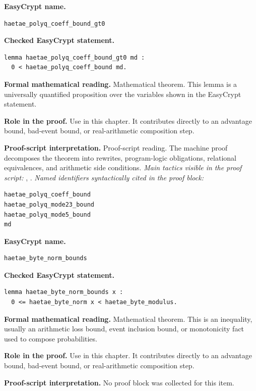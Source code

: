 \begin{formaltheorem}
\noindent\textbf{EasyCrypt name.}
\begin{lstlisting}[language=EasyCrypt,basicstyle=\ttfamily\scriptsize]
haetae_polyq_coeff_bound_gt0
\end{lstlisting}
\noindent\textbf{Checked EasyCrypt statement.}
\begin{lstlisting}[language=EasyCrypt,basicstyle=\ttfamily\scriptsize]
lemma haetae_polyq_coeff_bound_gt0 md :
  0 < haetae_polyq_coeff_bound md.
\end{lstlisting}
\noindent\textbf{Formal mathematical reading.}
Mathematical theorem. This lemma is a universally quantified proposition over the variables shown in the EasyCrypt statement.

\noindent\textbf{Role in the proof.}
Use in this chapter. It contributes directly to an advantage bound, bad-event bound, or real-arithmetic composition step.

\noindent\textbf{Proof-script interpretation.}
Proof-script reading. The machine proof decomposes the theorem into rewrites, program-logic obligations, relational equivalences, and arithmetic side conditions.
\emph{Main tactics visible in the proof script:} , .
\emph{Named identifiers syntactically cited in the proof block:}
\begin{lstlisting}[language=EasyCrypt,basicstyle=\ttfamily\scriptsize]
haetae_polyq_coeff_bound
haetae_polyq_mode23_bound
haetae_polyq_mode5_bound
md
\end{lstlisting}

\end{formaltheorem}

\begin{formaltheorem}
\noindent\textbf{EasyCrypt name.}
\begin{lstlisting}[language=EasyCrypt,basicstyle=\ttfamily\scriptsize]
haetae_byte_norm_bounds
\end{lstlisting}
\noindent\textbf{Checked EasyCrypt statement.}
\begin{lstlisting}[language=EasyCrypt,basicstyle=\ttfamily\scriptsize]
lemma haetae_byte_norm_bounds x :
  0 <= haetae_byte_norm x < haetae_byte_modulus.
\end{lstlisting}
\noindent\textbf{Formal mathematical reading.}
Mathematical theorem. This is an inequality, usually an arithmetic loss bound, event inclusion bound, or monotonicity fact used to compose probabilities.

\noindent\textbf{Role in the proof.}
Use in this chapter. It contributes directly to an advantage bound, bad-event bound, or real-arithmetic composition step.

\noindent\textbf{Proof-script interpretation.}
No proof block was collected for this item.

\end{formaltheorem}


